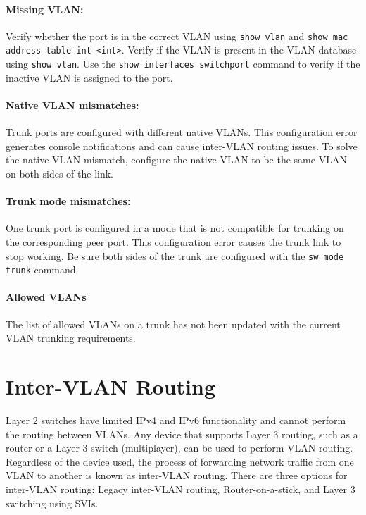 \paragraph{Missing VLAN:} Verify whether the port is in the correct VLAN using \verb|show vlan| and \verb|show mac address-table int <int>|. Verify if the VLAN is present in the VLAN database using \verb|show vlan|. Use the \verb|show interfaces switchport| command to verify if the inactive VLAN is assigned to the port.


\paragraph{Native VLAN mismatches:} Trunk ports are configured with different native VLANs. This configuration error generates console notifications and can cause inter-VLAN routing issues. To solve the native VLAN mismatch, configure the native VLAN to be the same VLAN on both sides of the link.

\paragraph{Trunk mode mismatches:} One trunk port is configured in a mode that is not compatible for trunking on the corresponding peer port. This configuration error causes the trunk link to stop working. Be sure both sides of the trunk are configured with the \verb|sw mode trunk| command. 

\paragraph{Allowed VLANs} The list of allowed VLANs on a trunk has not been updated with the current VLAN trunking requirements. 

\section{Inter-VLAN Routing}

Layer 2 switches have limited IPv4 and IPv6 functionality and cannot perform the routing between VLANs. Any device that supports Layer 3 routing, such as a router or a Layer 3 switch (multiplayer), can be used to perform VLAN routing. Regardless of the device used, the process of forwarding network traffic from one VLAN to another is known as inter-VLAN routing. There are three options for inter-VLAN routing: Legacy inter-VLAN routing, Router-on-a-stick, and Layer 3 switching using SVIs.


